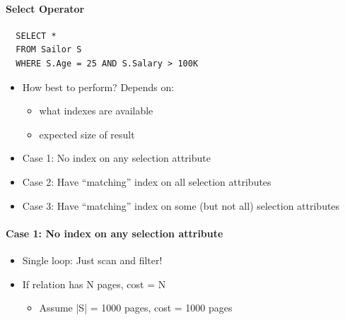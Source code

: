 \paragraph{Select Operator}
\begin{lstlisting}
  SELECT *
  FROM Sailor S
  WHERE S.Age = 25 AND S.Salary > 100K
\end{lstlisting}

\begin{itemize}
\item How best to perform? Depends on:
  \begin{itemize}
  \item what indexes are available
  \item expected size of result
  \end{itemize}

\item Case 1: No index on any selection attribute
\item Case 2: Have ``matching'' index on all selection attributes
\item Case 3: Have ``matching'' index on some (but not all)
  selection attributes
\end{itemize}

\paragraph{Case 1: No index on any selection attribute}
\begin{itemize}
\item Single loop: Just scan and filter!
\item If relation has N pages, cost = N
  \begin{itemize}
  \item Assume |S| = 1000 pages, cost = 1000 pages
  \end{itemize}
\end{itemize}

